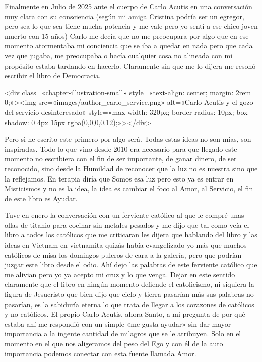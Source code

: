 \documentclass[12pt,twoside,openany]{book}
\begin{document}
Finalmente en Julio de 2025 ante el cuerpo de Carlo Acutis en una conversación muy clara con su consciencia (según mi amiga Cristina podría ser un egregor, pero sea lo que sea tiene mucha potencia y me vale pero yo sentí a ese chico joven muerto con 15 años) Carlo me decía que no me preocupara por algo que en ese momento atormentaba mi conciencia que se iba a quedar en nada pero que cada vez que jugaba, me preocupaba o hacía cualquier cosa no alineada con mi propósito estaba tardando en hacerlo. Claramente sin que me lo dijera me resonó escribir el libro de Democracia.

<div class=«chapter-illustration-small» style=«text-align: center; margin: 2rem 0;»><img src=«images/author_carlo_service.png» alt=«Carlo Acutis y el gozo del servicio desinteresado» style=«max-width: 320px; border-radius: 10px; box-shadow: 0 4px 15px rgba(0,0,0,0.12);»></div>

Pero si he escrito este primero por algo será. Todas estas ideas no son mías, son inspiradas. Todo lo que vino desde 2010 era necesario para que llegado este momento no escribiera con el fin de ser importante, de ganar dinero, de ser reconocido, sino desde la Humildad de reconocer que la luz no es nuestra sino que la reflejamos. En terapia diría que Somos esa luz pero esto ya es entrar en Misticismos y no es la idea, la idea es cambiar el foco al Amor, al Servicio, el fin de este libro es Ayudar.

Tuve en enero la conversación con un ferviente católico al que le compré unas ollas de titanio para cocinar sin metales pesados y me dijo que tal como veía el libro a todos los católicos que me criticaran les dijera que hablando del libro y las ideas en Vietnam en vietnamita quizás había evangelizado yo más que muchos católicos de misa los domingos pulcros de cara a la galería, pero que podrían juzgar este libro desde el odio. Ahí dejo las palabras de este ferviente católico que me alivian pero yo ya acepto mi cruz y lo que venga. Dejar en este sentido claramente que el libro en ningún momento defiende el catolicismo, ni siquiera la figura de Jesucristo que bien dijo que cielo y tierra pasarían más sus palabras no pasarían, es la sabiduría eterna lo que trata de llegar a los corazones de católicos y no católicos. El propio Carlo Acutis, ahora Santo, a mi pregunta de por qué estaba ahí me respondió con un simple «me gusta ayudar» sin dar mayor importancia a la ingente cantidad de milagros que se le atribuyen. Solo en el momento en el que nos aligeramos del peso del Ego y con él de la auto importancia podemos conectar con esta fuente llamada Amor.
\end{document}
